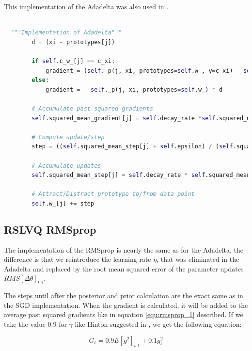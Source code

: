 \documentclass[12pt,oneside,a4paper,parskip]{scrbook}
\begin{document}
This implementation of the Adadelta was also used in \cite{PassiveDriftonRSLVQ}.

\begin{lstlisting}[label=lst:adadelta,
  language=python,
  firstnumber=1,
  caption= Adadelta implementation from \cite{PassiveDriftonRSLVQ}.]			   

  """Implementation of Adadelta"""
        d = (xi - prototypes[j])

        if self.c_w_[j] == c_xi:
            gradient = (self._p(j, xi, prototypes=self.w_, y=c_xi) - self._p(j, xi, prototypes=self.w_)) * d
        else:
            gradient = - self._p(j, xi, prototypes=self.w_) * d

        # Accumulate past squared gradients
        self.squared_mean_gradient[j] = self.decay_rate *self.squared_mean_gradient[j] + (1 - self.decay_rate) * gradient ** 2

        # Compute update/step
        step = ((self.squared_mean_step[j] + self.epsilon) / (self.squared_mean_gradient[j] + self.epsilon)) **0.5 * gradient

        # Accumulate updates
        self.squared_mean_step[j] = self.decay_rate * self.squared_mean_step[j] + (1 - self.decay_rate) * step ** 2

        # Attract/Distract prototype to/from data point
        self.w_[j] += step
\end{lstlisting}

\subsection{RSLVQ RMSprop}

The implementation of the RMSprop is nearly the same as for the Adadelta, the difference is that we reintroduce the learning
rate $\eta$, that was eliminated in the Adadelta and replaced by the root mean squared error of the parameter updates $\textit{RMS}[\Delta\theta]_\textit{t-1}$.

The steps until after the posterior and prior calculation are the exact same as in the SGD implementation.
When the gradient is calculated, it will be added to the average past squared gradients like in equation \ref{equ:rmsprop_1} described.
If we take the value $0.9$ for $\gamma$ like Hinton suggested in \cite{RMSprop_Hinton}, we get the following equation:

\begin{equation}
  G_t = 0.9\textit{E}[\textit{g}^2]_\textit{t-1} + 0.1\textit{g}^2_t 
\end{equation}
\end{document}
